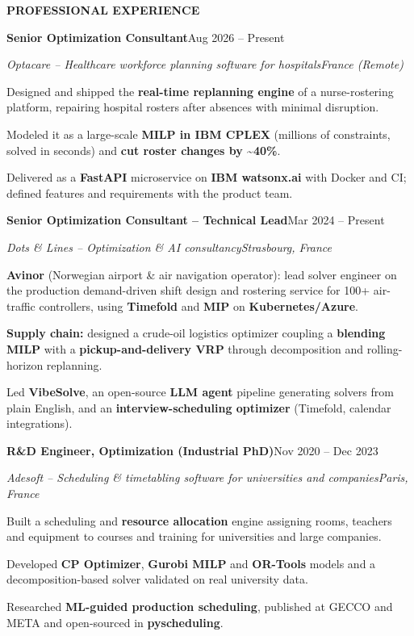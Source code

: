 \documentclass[10pt,letterpaper]{article}
\newcommand{\cvsection}[1]{%
  \vspace{7pt}%
  {\color{accent}\large\bfseries\MakeUppercase{#1}}\par
  \vspace{-4pt}{\color{accent}\rule{\linewidth}{0.6pt}}\par
  \vspace{2pt}}
\newcommand{\cvrole}[4]{%
  \vspace{4pt}%
  {\bfseries #1}\hfill #2\par
  {\itshape #3}\hfill {\itshape #4}\par
  \vspace{1pt}}
\newenvironment{cvitems}{%
  \begin{list}{\textbullet}{%
    \setlength{\leftmargin}{1.2em}\setlength{\labelwidth}{0.8em}%
    \setlength{\labelsep}{0.4em}\setlength{\itemsep}{1pt}%
    \setlength{\parsep}{0pt}\setlength{\topsep}{1pt}\setlength{\partopsep}{0pt}}%
  \small}{\end{list}}
\begin{document}
\cvsection{Professional Experience}

\cvrole{Senior Optimization Consultant}{Aug 2026 -- Present}
       {Optacare -- Healthcare workforce planning software for hospitals}{France (Remote)}
\begin{cvitems}
  \item Designed and shipped the \textbf{real-time replanning engine} of a nurse-rostering platform,
    repairing hospital rosters after absences with minimal disruption.
  \item Modeled it as a large-scale \textbf{MILP in IBM CPLEX} (millions of constraints, solved in
    seconds) and \textbf{cut roster changes by \textasciitilde40\%}.
  \item Delivered as a \textbf{FastAPI} microservice on \textbf{IBM watsonx.ai} with Docker and CI;
    defined features and requirements with the product team.
\end{cvitems}

\cvrole{Senior Optimization Consultant -- Technical Lead}{Mar 2024 -- Present}
       {Dots \& Lines -- Optimization \& AI consultancy}{Strasbourg, France}
\begin{cvitems}
  \item \textbf{Avinor} (Norwegian airport \& air navigation operator): lead solver engineer on the production
    demand-driven shift design and rostering service for 100+ air-traffic controllers, using \textbf{Timefold} and \textbf{MIP} on \textbf{Kubernetes/Azure}.
  \item \textbf{Supply chain:} designed a crude-oil logistics optimizer coupling a \textbf{blending MILP}
    with a \textbf{pickup-and-delivery VRP} through decomposition and rolling-horizon replanning.
  \item Led \textbf{VibeSolve}, an open-source \textbf{LLM agent} pipeline generating solvers from plain English,
    and an \textbf{interview-scheduling optimizer} (Timefold, calendar integrations).
\end{cvitems}

\cvrole{R\&D Engineer, Optimization (Industrial PhD)}{Nov 2020 -- Dec 2023}
       {Adesoft -- Scheduling \& timetabling software for universities and companies}{Paris, France}
\begin{cvitems}
  \item Built a scheduling and \textbf{resource allocation} engine assigning rooms, teachers and equipment
    to courses and training for universities and large companies.
  \item Developed \textbf{CP Optimizer}, \textbf{Gurobi MILP} and \textbf{OR-Tools} models and a
    decomposition-based solver validated on real university data.
  \item Researched \textbf{ML-guided production scheduling}, published at GECCO and META and
    open-sourced in \textbf{pyscheduling}.
\end{cvitems}
\end{document}
